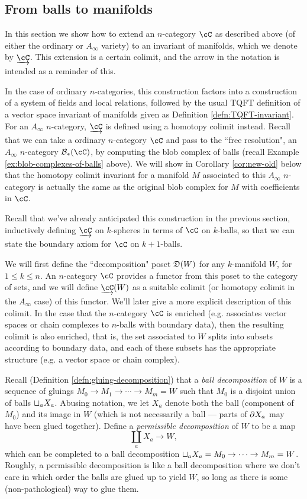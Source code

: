 \subsection{From balls to manifolds}
\label{ss:ncat_fields} \label{ss:ncat-coend}
In this section we show how to extend an $n$-category $\cC$ as described above 
(of either the ordinary or $A_\infty$ variety) to an invariant of manifolds, which we denote by $\cl{\cC}$.
This extension is a certain colimit, and the arrow in the notation is intended as a reminder of this.

In the case of ordinary $n$-categories, this construction factors into a construction of a 
system of fields and local relations, followed by the usual TQFT definition of a 
vector space invariant of manifolds given as Definition \ref{defn:TQFT-invariant}.
For an $A_\infty$ $n$-category, $\cl{\cC}$ is defined using a homotopy colimit instead.
Recall that we can take a ordinary $n$-category $\cC$ and pass to the ``free resolution", 
an $A_\infty$ $n$-category $\bc_*(\cC)$, by computing the blob complex of balls 
(recall Example \ref{ex:blob-complexes-of-balls} above).
We will show in Corollary \ref{cor:new-old} below that the homotopy colimit invariant 
for a manifold $M$ associated to this $A_\infty$ $n$-category is actually the 
same as the original blob complex for $M$ with coefficients in $\cC$.

Recall that we've already anticipated this construction in the previous section, 
inductively defining $\cl{\cC}$ on $k$-spheres in terms of $\cC$ on $k$-balls, 
so that we can state the boundary axiom for $\cC$ on $k+1$-balls.

\medskip

We will first define the ``decomposition" poset $\mathfrak{D}(W)$ for any $k$-manifold $W$, for $1 \leq k \leq n$. 
An $n$-category $\cC$ provides a functor from this poset to the category of sets, 
and we  will define $\cl{\cC}(W)$ as a suitable colimit 
(or homotopy colimit in the $A_\infty$ case) of this functor. 
We'll later give a more explicit description of this colimit.
In the case that the $n$-category $\cC$ is enriched (e.g. associates vector spaces or chain complexes to $n$-balls with boundary data), 
then the resulting colimit is also enriched, that is, the set associated to $W$ splits into subsets according to boundary data, and each of these subsets has the appropriate structure (e.g. a vector space or chain complex).

Recall (Definition \ref{defn:gluing-decomposition}) that a {\it ball decomposition} of $W$ is a 
sequence of gluings $M_0\to M_1\to\cdots\to M_m = W$ such that $M_0$ is a disjoint union of balls
$\sqcup_a X_a$.
Abusing notation, we let $X_a$ denote both the ball (component of $M_0$) and
its image in $W$ (which is not necessarily a ball --- parts of $\partial X_a$ may have been glued together).
Define a {\it permissible decomposition} of $W$ to be a map
\[
	\coprod_a X_a \to W,
\]
which can be completed to a ball decomposition $\sqcup_a X_a = M_0\to\cdots\to M_m = W$.
Roughly, a permissible decomposition is like a ball decomposition where we don't care in which order the balls
are glued up to yield $W$, so long as there is some (non-pathological) way to glue them.

